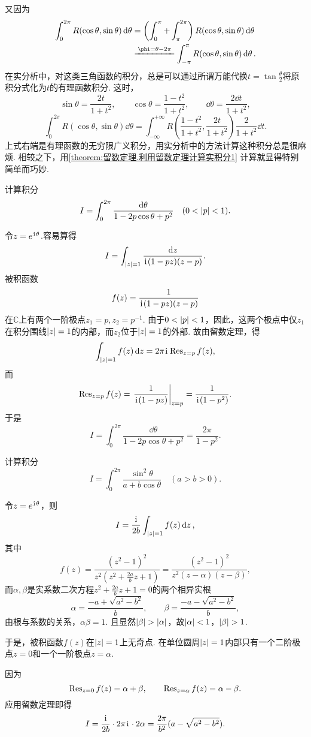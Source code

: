 又因为\begin{align*}
\int_0^{2\pi} R(\cos\theta,\sin\theta) \dd{\theta}
&= \left( \int_0^\pi + \int_{\pi}^{2\pi} \right) R(\cos\theta,\sin\theta) \dd{\theta} \\
&\xlongequal{\phi=\theta-2\pi} \int_{-\pi}^\pi R(\cos\theta,\sin\theta) \dd{\theta}.
\end{align*}
在实分析中，对这类三角函数的积分，总是可以通过所谓万能代换\(t = \tan\frac{\theta}{2}\)将原积分式化为\(t\)的有理函数积分.
这时，\[
\sin\theta = \frac{2t}{1+t^2},
\qquad
\cos\theta = \frac{1-t^2}{1+t^2},
\qquad
\dd{\theta} = \frac{2 \dd{t}}{1+t^2},
\]\[
\int_0^{2\pi} R(\cos\theta,\sin\theta) \dd{\theta}
= \int_{-\infty}^{+\infty} R\left(\frac{1-t^2}{1+t^2},\frac{2t}{1+t^2}\right) \frac{2}{1+t^2} \dd{t}.
\]上式右端是有理函数的无穷限广义积分，用实分析中的方法计算这种积分总是很麻烦.
相较之下，用\cref{theorem:留数定理.利用留数定理计算实积分1} 计算就显得特别简单而巧妙.

\begin{example}[泊松积分]\label{example:留数定理.泊松积分}
计算积分\[
I = \int_0^{2\pi} \frac{\dd{\theta}}{1-2p\cos\theta+p^2} \quad(0<\abs{p}<1).
\]
\begin{solution}
令\(z=e^{\kern1pt\mathrm{i}\kern1pt\theta}\).容易算得\[
I = \int_{\abs{z}=1} \frac{\dd{z}}{\kern1pt\mathrm{i}\kern1pt(1-pz)(z-p)}.
\]被积函数\[
f(z) = \frac{1}{\kern1pt\mathrm{i}\kern1pt(1-pz)(z-p)}
\]在\(\mathbb{C}\)上有两个一阶极点\(z_1=p, z_2=p^{-1}\).
由于\(0<\abs{p}<1\)，因此，这两个极点中仅\(z_1\)在积分围线\(\abs{z}=1\)的内部，而\(z_2\)位于\(\abs{z}=1\)的外部.
故由留数定理，得\[
\int_{\abs{z}=1} f(z) \dd{z}
= 2\pi\kern1pt\mathrm{i}\kern1pt \operatorname{Res}_{z=p} f(z),
\]而\[
\Res_{z=p} f(z)
= \eval{ \frac{1}{\iu(1-pz)} }_{z=p}
= \frac{1}{\iu(1-p^2)}.
\]于是\[
I = \int_0^{2\pi} \frac{\dd{\theta}}{1-2p\cos\theta+p^2}
= \frac{2\pi}{1-p^2}.
\]
\end{solution}
\end{example}

\begin{example}
计算积分\[
I = \int_0^{2\pi} \frac{\sin^2 \theta}{a+b\cos\theta} \quad(a>b>0).
\]
\begin{solution}
令\(z=e^{\kern1pt\mathrm{i}\kern1pt\theta}\)，则\[
I = \frac{\kern1pt\mathrm{i}\kern1pt}{2b} \int_{\abs{z}=1} f(z) \dd{z},
\]其中\[
f(z) = \frac{(z^2-1)^2}{z^2 \left(z^2+\frac{2a}{b}z+1\right)}
= \frac{(z^2-1)^2}{z^2(z-\alpha)(z-\beta)},
\]而\(\alpha,\beta\)是实系数二次方程\(z^2+\frac{2a}{b}z+1=0\)的两个相异实根\[
\alpha=\frac{-a+\sqrt{a^2-b^2}}{b},
\qquad
\beta=\frac{-a-\sqrt{a^2-b^2}}{b},
\]由根与系数的关系，\(\alpha\beta=1\).
且显然\(\abs{\beta}>\abs{\alpha}\)，故\(\abs{\alpha}<1\)，\(\abs{\beta}>1\).

于是，被积函数\(f(z)\)在\(\abs{z}=1\)上无奇点.
在单位圆周\(\abs{z}=1\)内部只有一个二阶极点\(z=0\)和一个一阶极点\(z=\alpha\).

因为\[
\operatorname{Res}_{z=0} f(z) = \alpha+\beta,
\qquad
\operatorname{Res}_{z=\alpha} f(z) = \alpha-\beta.
\]应用留数定理即得\[
I = \frac{\kern1pt\mathrm{i}\kern1pt}{2b} \cdot 2\pi\kern1pt\mathrm{i}\kern1pt \cdot 2\alpha
= \frac{2\pi}{b^2} (a-\sqrt{a^2-b^2}).
\]
\end{solution}
\end{example}

